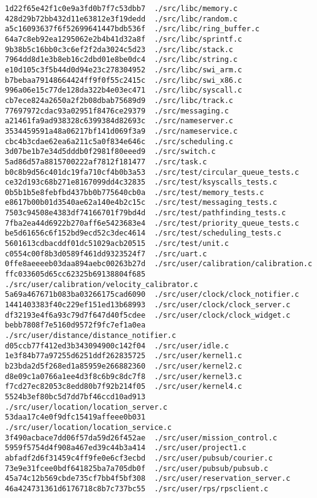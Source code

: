 \documentclass{article}
\begin{document}
\begin{verbatim}
1d22f65e42f1c0e9a3fd0b7f7c53dbb7  ./src/libc/memory.c
428d29b72bb432d11e63812e3f19dedd  ./src/libc/random.c
a5c16093637f6f52699641447bdb536f  ./src/libc/ring_buffer.c
64a7c8eb92ea1295062e2b4b41d32a8f  ./src/libc/sprintf.c
9b38b5c16bb0c3c6ef2f2da3024c5d23  ./src/libc/stack.c
7964dd8d1e3b8eb16c2dbd01e8be0dc4  ./src/libc/string.c
e10d105c3f5b44d0d94e23c278304952  ./src/libc/swi_arm.c
b7bebaa79148664424ff9f0f55c2415c  ./src/libc/swi_x86.c
996a06e15c77de128da322b4e03ec471  ./src/libc/syscall.c
cb7ece824a2650a2f2b08dbab75689d9  ./src/libc/track.c
77697972cdac93a02951f8476ce29379  ./src/messaging.c
a21461fa9ad938328c6399384d82693c  ./src/nameserver.c
3534459591a48a06217bf141d069f3a9  ./src/nameservice.c
cbc4b3cdae62ea6a211c5a0f834e646c  ./src/scheduling.c
3d07be1b7e34d5dddb0f2981f80eeed9  ./src/switch.c
5ad86d57a8815700222af7812f181477  ./src/task.c
b0c8b9d56c401dc19fa710cf4b0b3a53  ./src/test/circular_queue_tests.c
ce32d193c68b271e8167099dd4c32835  ./src/test/ksyscalls_tests.c
0b5b1b5e8febfbd437bb0b775640cb0a  ./src/test/memory_tests.c
e8617b00b01d3540ae62a140e4b2c15c  ./src/test/messaging_tests.c
7503c94508e4383df74166701f79bd4d  ./src/test/pathfinding_tests.c
7fba2ea44d6922b270aff6e5423683e4  ./src/test/priority_queue_tests.c
be5d61656c6f152bd9ecd52c3dec4614  ./src/test/scheduling_tests.c
5601613cdbacddf01dc51029acb20515  ./src/test/unit.c
c0554c00f8b3d0589f461dd9323524f7  ./src/uart.c
0ffe8aeeeeb03daa894aebc00263b27d  ./src/user/calibration/calibration.c
ffc033605d65cc62325b69138804f685  ./src/user/calibration/velocity_calibrator.c
5a69a467671b083ba03266175cad6090  ./src/user/clock/clock_notifier.c
1441403383f40c229ef151ed13b68993  ./src/user/clock/clock_server.c
df32193e4f6a93c79d7f647d40f5cdee  ./src/user/clock/clock_widget.c
bebb7808f7e5160d9572f9fc7ef1a0ea  ./src/user/distance/distance_notifier.c
d05ccb77f412ed3b343094900c142f04  ./src/user/idle.c
1e3f84b77a97255d6251ddf262835725  ./src/user/kernel1.c
b23bda2d5f268ed1a85959e266882360  ./src/user/kernel2.c
d8e09c1a0766a1ee4d3f8c6b9c8dc7f8  ./src/user/kernel3.c
f7cd27ec82053c8edd80b7f92b214f05  ./src/user/kernel4.c
5524b3ef80bc5d7dd7bf46ccd10ad913  ./src/user/location/location_server.c
53daa17c4e0f9dfc15419affeee0b031  ./src/user/location/location_service.c
3f490acbace7dd06f57da59d26f452ae  ./src/user/mission_control.c
5959f5754d4f908a467ed39c44b3a414  ./src/user/project1.c
abfadf2d6f31459c4ff9fe0e6cf3ecbd  ./src/user/pubsub/courier.c
73e9e31fcee0bdf641825ba7a705db0f  ./src/user/pubsub/pubsub.c
45a74c12b569cbde735cf7bb4f5bf308  ./src/user/reservation_server.c
46a424731361d6176718c8b7c737bc55  ./src/user/rps/rpsclient.c

\end{verbatim}
\end{document}
